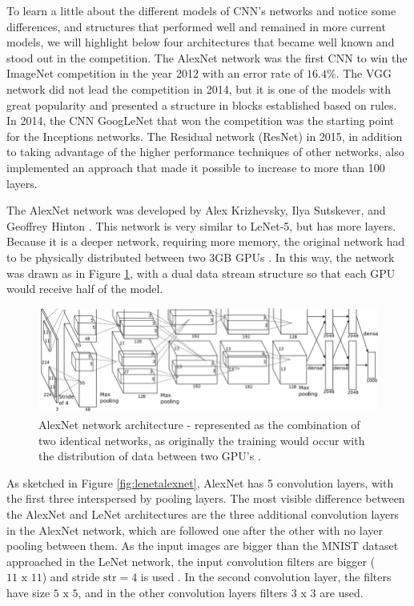 To learn a little about the different models of CNN's networks and notice some differences, and structures that performed well and remained in more current models, we will highlight below four architectures that became well known and stood out in the competition. The AlexNet network was the first CNN to win the ImageNet competition in the year 2012 with an error rate of $16.4\%$. The VGG network did not lead the competition in 2014, but it is one of the models with great popularity and presented a structure in blocks established based on rules. In 2014, the CNN GoogLeNet that won the competition was the starting point for the Inceptions networks. The Residual network (ResNet) in 2015, in addition to taking advantage of the higher performance techniques of other networks, also implemented an approach that made it possible to increase to more than 100 layers.

The AlexNet network was developed by Alex Krizhevsky, Ilya Sutskever, and Geoffrey Hinton \cite{geron2019}. This network is very similar to LeNet-5, but has more layers. Because it is a deeper network, requiring more memory, the original network had to be physically distributed between two 3GB GPUs  \cite{krizhevsky2012}. In this way, the network was drawn as in Figure \ref{fig:alexnet}, with a dual data stream structure so that each GPU would receive half of the model.

\begin{figure}
    \centering
    \includegraphics[scale=0.4]{"Part 3 - Learning Systems/Supervised Learning/Deep Learning/images/figure128.png"}
    \caption{ AlexNet network architecture - represented as the combination of two identical networks, as originally the training would occur with the distribution of data between two GPU's \cite{krizhevsky2012}.}
    \label{fig:alexnet}
\end{figure}

As sketched in Figure \ref{fig:lenetalexnet}, AlexNet has 5 convolution layers, with the first three interspersed by pooling layers. The most visible difference between the AlexNet and LeNet architectures are the three additional convolution layers in the AlexNet network, which are followed one after the other with no layer pooling between them. As the input images are bigger than the MNIST dataset approached in the LeNet network, the input convolution filters are bigger ($11\text{ x }11$) and stride $\text{str} = 4$ is used . In the second convolution layer, the filters have size $5\text{ x }5$, and in the other convolution layers filters $3\text{ x }3$ are used.

